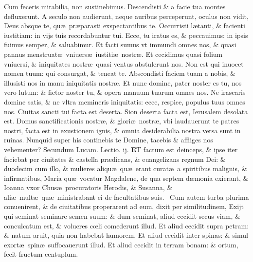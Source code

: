 \documentclass[a5paper,10pt]{book}
\def\leftmarginnote{%
	\lrmarginnote{\hskip -\marginparsep \hskip -6.5em}}
\def\ae{æ}
\def\oe{œ}
\begin{document}
\begin{multicols*}{2}
Cum feceris mirabilia, non sustinebimus. Descendisti \& a facie tua montes defluxerunt.
A seculo non audierunt, neque auribus perceperunt, oculus non vidit, Deus absque te, qu\ae \ pr\ae parasti exspectantibus te.
Occurristi l\ae tanti, \& facienti iustitiam: in vijs tuis recordabuntur tui.
Ecce, tu iratus es, \& peccauimus: in ipsis fuimus semper, \& saluabimur.
Et facti sumus vt immundi omnes nos, \& quasi pannus menstruat\ae \ vniuers\ae \ iustiti\ae \ nostr\ae .
Et cecidimus quasi folium vniuersi, \& iniquitates nostr\ae \ quasi ventus abstulerunt nos.
Non est qui inuocet nomen tuum: qui consurgat, \& teneat te.
Abscondisti faciem tuam a nobis, \& illusisti nos in manu iniquitatis nostr\ae .
Et nunc domine, pater noster es tu, nos vero lutum: \& fictor noster tu, \& opera manuum tuarum omnes nos. 
Ne irascaris domine satis, \& ne vltra memineris iniquitatis: ecce, respice, populus tuus omnes nos.
Ciuitas sancti tui facta est deserta. Sion deserta facta est, Ierusalem desolata est.
Domus sanctificationis nostr\ae , \& glori\ae \ nostr\ae , vbi laudauerunt te patres nostri, facta
est in exustionem ignis, \& omnia desiderabilia nostra versa sunt in ruinas.
Nunquid super his continebis te Domine, tacebis \& affliges nos vehementer?
\newline \color{red} Secundum Lucam. \hfill Lectio. ij. \color{black}
\vspace{-.25em}
\lettrine[lines=2]{\bfseries \color{red} E}{}T\leftmarginnote{\begin{flushright}ca. 8.\end{flushright}} factum est deinceps, \& ipse iter faciebat per ciuitates \& castella pr\ae dicans, \& euangelizans regnum Dei: \& duodecim cum illo, \& mulieres aliqu\ae \ qu\ae \ erant curat\ae \ a spiritibus malignis, \& infirmatibus, Maria qu\ae \ vocatur Magdalene, de qua septem d\ae monia exierant, \& Ioanna vxor Chus\ae \ procuratoris Herodis, \& Susanna, \& ali\ae \ mult\ae \ qu\ae \ ministrabant ei de facultatibus suis. \textdagger \ 
Cum\leftmarginnote{\begin{flushright}B\end{flushright}} autem turba plurima conuenirent, \& de ciuitatibus properarent ad eum, dixit per similitudinem, Exijt qui seminat seminare semen suum: \& dum seminat, aliud cecidit secus viam, \& conculcatum est, \& volucres c\oe li comederunt illud.
Et aliud cecidit supra petram: \& natum aruit, quia non habebat humorem.
Et aliud cecidit inter spinas: \& simul exort\ae \ spin\ae \ suffocauerunt illud.
Et aliud cecidit in terram bonam: \& ortum, fecit fructum centuplum.

\end{multicols*}
\end{document}
